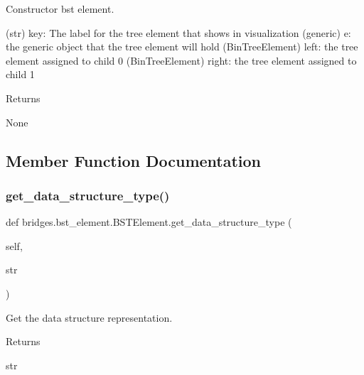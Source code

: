 Constructor bst element. 

(str) key\+: The label for the tree element that shows in visualization (generic) e\+: the generic object that the tree element will hold (Bin\+Tree\+Element) left\+: the tree element assigned to child 0 (Bin\+Tree\+Element) right\+: the tree element assigned to child 1 \begin{DoxyReturn}{Returns}


None 
\end{DoxyReturn}


\subsection{Member Function Documentation}
\mbox{\label{classbridges_1_1bst__element_1_1_b_s_t_element_ad6763a7381b91e16d9dc927a6f501c81}} 
\subsubsection{\texorpdfstring{get\+\_\+data\+\_\+structure\+\_\+type()}{get\_data\_structure\_type()}}
{\footnotesize\ttfamily def bridges.\+bst\+\_\+element.\+B\+S\+T\+Element.\+get\+\_\+data\+\_\+structure\+\_\+type (\begin{DoxyParamCaption}\item[{}]{self,  }\item[{}]{str }\end{DoxyParamCaption})}



Get the data structure representation. 

\begin{DoxyReturn}{Returns}


str 
\end{DoxyReturn}
\mbox{\label{classbridges_1_1bst__element_1_1_b_s_t_element_a5f49ae18e50343ed63a83baa2c42e192}} 
